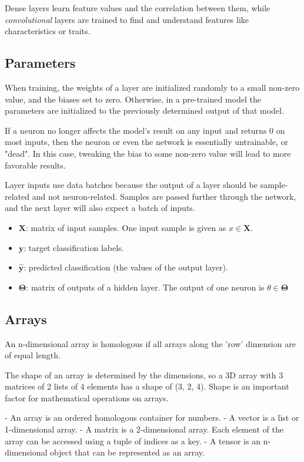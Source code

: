 \documentclass[a4paper]{article}
\newcommand{\matr}[1]{\mathbf{#1}}
\newcommand{\vect}[1]{\bm{#1}}
\begin{document}
Dense layers learn feature values and the correlation between them, while \emph{convolutional} layers are trained to find and understand features like characteristics or traits. 

\subsection*{Parameters}
When training, the weights of a layer are initialized randomly to a small non-zero value, and the biases set to zero. Otherwise, in a pre-trained model the parameters are initialized to the previously determined output of that model. 

If a neuron no longer affects the model's result on any input and returns 0 on most inputs, then the neuron or even the network is essentially untrainable, or "dead". In this case, tweaking the bias to some non-zero value will lead to more favorable results. 

Layer inputs use data batches because the output of a layer should be sample-related and not neuron-related. Samples are passed further through the network, and the next layer will also expect a batch of inputs. 

\begin{itemize}
    \item $\matr{X}$: matrix of input samples. One input sample is given as $x \in \matr{X}$.
    \item $\bm{y}$: target classification labels.
    \item $\vect{\hat{y}}$: predicted classification (the values of the output layer).
    \item $\matr{\Theta}$: matrix of outputs of a hidden layer. The output of one neuron is $\theta \in \matr{\Theta}$
\end{itemize}


\subsection*{Arrays}
An n-dimensional array is homologous if all arrays along the 'row' dimension are of equal length.

The shape of an array is determined by the dimensions, so a 3D array with 3 matrices of 2 lists of 4 elements has a shape of (3, 2, 4). Shape is an important factor for mathematical operations on arrays.

- An array is an ordered homologous container for numbers.
- A vector is a list or 1-dimensional array.
- A matrix is a 2-dimensional array. Each element of the array can be accessed using a tuple of indices as a key.
- A tensor is an n-dimensional object that can be represented as an array. 
\end{document}
